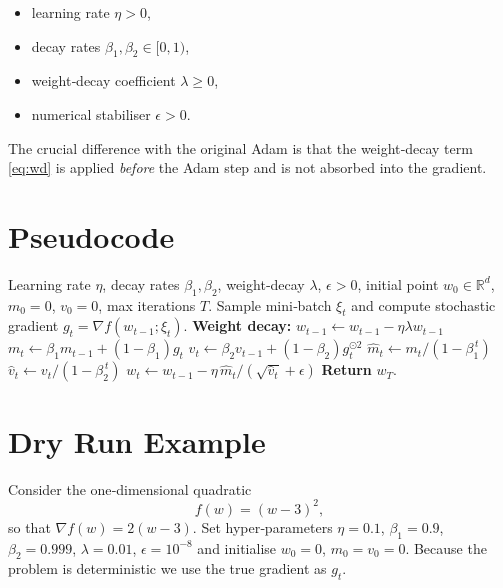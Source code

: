 \documentclass{article}
\newcommand{\R}{\mathbb{R}}
\begin{document}
\begin{itemize}
    \item learning rate $\eta>0$,
    \item decay rates $\beta_1,\beta_2\in[0,1)$,
    \item weight‑decay coefficient $\lambda\ge 0$,
    \item numerical stabiliser $\epsilon>0$.
\end{itemize}

The crucial difference with the original Adam is that the weight‑decay term \eqref{eq:wd} is applied \emph{before} the Adam step and is not absorbed into the gradient.

\section{Pseudocode}
\label{sec:pseudocode}
\begin{algorithm}[H]
\caption{AdamW}
\begin{algorithmic}[1]
\Require Learning rate $\eta$, decay rates $\beta_1,\beta_2$, weight‑decay $\lambda$, $\epsilon>0$, 
        initial point $w_0\in\R^d$, $m_0=0$, $v_0=0$, max iterations $T$.
    \State Sample mini‑batch $\xi_t$ and compute stochastic gradient $g_t=\nabla f(w_{t-1};\xi_t)$.
    \State \textbf{Weight decay:} $w_{t-1}\gets w_{t-1}-\eta\lambda w_{t-1}$ \label{alg:wd}
    \State $m_t \gets \beta_1 m_{t-1} + (1-\beta_1) g_t$ \label{alg:m}
    \State $v_t \gets \beta_2 v_{t-1} + (1-\beta_2) g_t^{\odot 2}$ \label{alg:v}
    \State $\hat m_t \gets m_t/(1-\beta_1^{\,t})$ \label{alg:bc1}
    \State $\hat v_t \gets v_t/(1-\beta_2^{\,t})$ \label{alg:bc2}
    \State $w_t \gets w_{t-1} - \eta\, \hat m_t/(\sqrt{\hat v_t}+\epsilon)$ \label{alg:update}
\EndFor
\State \textbf{Return} $w_T$.
\end{algorithmic}
\end{algorithm}
\section{Dry Run Example}
\label{sec:dryrun}
Consider the one‑dimensional quadratic
\[
    f(w) = (w-3)^2 ,
\]
so that $\nabla f(w)=2(w-3)$.  
Set hyper‑parameters $\eta=0.1$, $\beta_1=0.9$, $\beta_2=0.999$, $\lambda=0.01$, $\epsilon=10^{-8}$ and initialise $w_0=0$, $m_0=v_0=0$.  
Because the problem is deterministic we use the true gradient as $g_t$.
\end{document}
